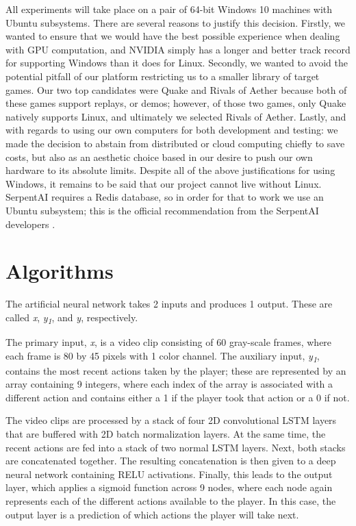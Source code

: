 All experiments will take place on a pair of 64-bit Windows 10 machines with Ubuntu subsystems. There are several reasons to justify this decision. Firstly, we wanted to ensure that we would have the best possible experience when dealing with GPU computation, and NVIDIA simply has a longer and better track record for supporting Windows than it does for Linux. Secondly, we wanted to avoid the potential pitfall of our platform restricting us to a smaller library of target games. Our two top candidates were Quake and Rivals of Aether because both of these games support replays, or demos; however, of those two games, only Quake natively supports Linux, and ultimately we selected Rivals of Aether. Lastly, and with regards to using our own computers for both development and testing: we made the decision to abstain from distributed or cloud computing chiefly to save costs, but also as an aesthetic choice based in our desire to push our own hardware to its absolute limits. Despite all of the above justifications for using Windows, it remains to be said that our project cannot live without Linux. SerpentAI requires a Redis database, so in order for that to work we use an Ubuntu subsystem; this is the official recommendation from the SerpentAI developers \cite{SerpentAI}.




\section{Algorithms}

The artificial neural network takes 2 inputs and produces 1 output. These are called \textit{x}, \textit{y\textsubscript{1}}, and \textit{y}, respectively.

The primary input, \textit{x}, is a video clip consisting of 60 gray-scale frames, where each frame is 80 by 45 pixels with 1 color channel. The auxiliary input, \textit{y\textsubscript{1}}, contains the most recent actions taken by the player; these are represented by an array containing 9 integers, where each index of the array is associated with a different action and contains either a 1 if the player took that action or a 0 if not.

The video clips are processed by a stack of four 2D convolutional LSTM layers that are buffered with 2D batch normalization layers. At the same time, the recent actions are fed into a stack of two normal LSTM layers. Next, both stacks are concatenated together. The resulting concatenation is then given to a deep neural network containing RELU activations. Finally, this leads to the output layer, which applies a sigmoid function across 9 nodes, where each node again represents each of the different actions available to the player. In this case, the output layer is a prediction of which actions the player will take next.


